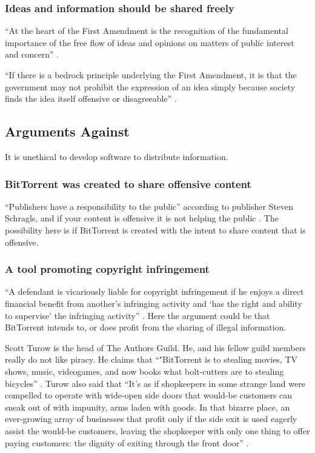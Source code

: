 \documentclass[11pt]{article}
\begin{document}
\subsubsection{Ideas and information should be shared freely}
``At the heart of the First Amendment is the recognition of the fundamental importance of the free flow of ideas and opinions on matters of public interest and concern'' \cite[51]{1988hustler}.

``If there is a bedrock principle underlying the First Amendment, it is that the government may not prohibit the expression of an idea simply because society finds the idea itself offensive or disagreeable'' \cite[414]{1989texas}.

\subsection{Arguments Against}
It is unethical to develop software to distribute information.

\subsubsection{BitTorrent was created to share offensive content}

``Publishers have a responsibility to the public'' according to publisher Steven Schragls, and if your content is offensive it is not helping the public \cite[46]{hawker}. The possibility here is if BitTorrent is created with the intent to share content that is offensive.

\subsubsection{A tool promoting copyright infringement}

``A defendant is vicariously liable for copyright infringement if he enjoys a direct financial benefit from another's infringing activity and `has the right and ability to supervise' the infringing activity'' \cite{2000m}. Here the argument could be that BitTorrent intends to, or does profit from the sharing of illegal information.

Scott Turow is the head of The Authors Guild. He, and his fellow guild members really do not like piracy. He claims that ``"BitTorrent is to stealing movies, TV shows, music, videogames, and now books what bolt-cutters are to stealing bicycles'' \cite{turow}. Turow also said that ``It's as if shopkeepers in some strange land were compelled to operate with wide-open side doors that would-be customers can sneak out of with impunity, arms laden with goods. In that bizarre place, an ever-growing array of businesses that profit only if the side exit is used eagerly assist the would-be customers, leaving the shopkeeper with only one thing to offer paying customers: the dignity of exiting through the front door'' \cite{turow}.
\end{document}

